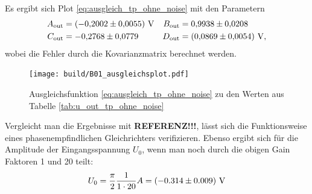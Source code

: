 Es ergibt sich Plot \ref{eq:ausgleich_tp_ohne_noise} mit den Parametern
\begin{align*}
    A_\text{out} &= \left(\num[]{-0.2002} \pm \num[]{0.0055}\right) \, \unit{\volt} & B_\text{out} &=  \num[]{0.9938} \pm \num[]{0.0208} \\
    C_\text{out} &= \num[]{-0.2768} \pm \num[]{0.0779} & D_\text{out} &= \left(\num[]{0.0869} \pm \num[]{0.0054}\right) \, \unit[]{\volt},
\end{align*}
wobei die Fehler durch die Kovarianzmatrix berechnet werden.
%
\begin{figure}[H]
    \texttt{[image: build/B01\_ausgleichsplot.pdf]}
    \caption[]{Ausgleichsfunktion \eqref{eq:ausgleich_tp_ohne_noise} zu den Werten aus Tabelle \ref{tab:u_out_tp_ohne_noise}}
    \label{fig:ausgleichsplot1}
\end{figure}

\noindent
Vergleicht man die Ergebnisse mit \textbf{REFERENZ!!!}, lässt sich die Funktionsweise eines phasenempfindlichen Gleichrichters verifizieren.
Ebenso ergibt sich für die Amplitude der Eingangsspannung $U_0$, wenn man noch durch die obigen Gain Faktoren 1 und 20 teilt:
\begin{align*}
    U_0 = \frac{\pi}{2} \frac{1}{1 \cdot 20} A = \left(-0.314 \pm 0.009\right) \, \unit[]{\volt}
\end{align*}
